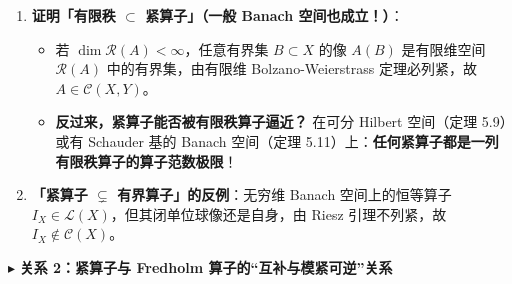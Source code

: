 \documentclass[11pt,a4paper]{article}
\providecommand{\tightlist}{\setlength{\itemsep}{2pt}\setlength{\parskip}{0pt}}
\newcommand{\SubSubHeading}[1]{%
  \Needspace{6.5\baselineskip}\vspace{5.5pt}\noindent
  \textcolor{AccentMain}{\scriptsize$\blacktriangleright$}\hspace{4pt}%
  {\small\bfseries\color{AccentMain}#1}\par\nopagebreak[4]\vspace{2.5pt}%
}
\newcommand{\FitDisplayMath}[1]{%
  \par\vspace{4.5pt}\noindent
  \begin{adjustbox}{max width=\linewidth, center}
    $\displaystyle #1$
  \end{adjustbox}
  \par\vspace{4.5pt}%
}
\begin{document}
\begin{enumerate}
\begin{itemize}
  \item
    再构造有限秩截断算子 \(A_N x \triangleq \sum_{n=1}^N (x, e_n)Ae_n\)（显然秩 \(\le N\)，故 \(A_N\) 有限秩，从而紧）。余项满足 
\FitDisplayMath{\lVert A - A_N\rVert \le \lVert A - A_N\rVert_2 = \left(\sum_{n=N+1}^\infty \lVert Ae_n\rVert^2\right)^{\frac{1}{2}} \xrightarrow{N\to\infty} 0.}

  \item
    因为紧算子集按算子范数闭（定理 5.4），故 \(A \in \mathcal{C}(H, G)\)！
  \item
    \textbf{真包含反例（紧但非 HS）}：在 \(\ell^2\) 上定义 \(Be_n = \frac{1}{\sqrt{n}}e_n\)。截断 \(B_N\) 满足 \(\lVert B - B_N\rVert = \frac{1}{\sqrt{N+1}} \to 0\)，故 \(B\) 是紧算子；但 \(\sum_{n=1}^\infty \lVert Be_n\rVert^2 = \sum_{n=1}^\infty \frac{1}{n} = +\infty\)，故 \(B \notin \mathcal{L}^2(\ell^2)\)！
  \end{itemize}
\item
  \textbf{证明「有限秩 \(\subset\) 紧算子」（一般 Banach 空间也成立！）}：

  \begin{itemize}
  \tightlist
  \item
    若 \(\dim\mathcal{R}(A) < \infty\)，任意有界集 \(B \subset X\) 的像 \(A(B)\) 是有限维空间 \(\mathcal{R}(A)\) 中的有界集，由有限维 Bolzano-Weierstrass 定理必列紧，故 \(A \in \mathcal{C}(X, Y)\)。
  \item
    \textbf{反过来，紧算子能否被有限秩算子逼近？} 在可分 Hilbert 空间（定理 5.9）或有 Schauder 基的 Banach 空间（定理 5.11）上：\textbf{任何紧算子都是一列有限秩算子的算子范数极限}！
  \end{itemize}
\item
  \textbf{「紧算子 \(\subsetneq\) 有界算子」的反例}：无穷维 Banach 空间上的恒等算子 \(I_X \in \mathcal{L}(X)\)，但其闭单位球像还是自身，由 Riesz 引理不列紧，故 \(I_X \notin \mathcal{C}(X)\)。
\end{enumerate}

\SubSubHeading{关系 2：紧算子与 Fredholm 算子的``互补与模紧可逆''关系}
\end{document}
